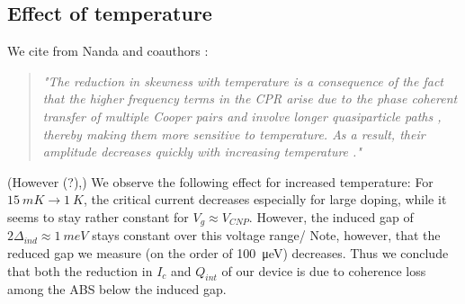 \subsection{Effect of temperature}
We cite from Nanda and coauthors \cite{nanda_currentphase_2017}:
\begin{quotation}
	\textit{"The reduction in skewness with temperature is a consequence of the fact that the higher frequency terms in the CPR arise due to the phase coherent transfer of multiple Cooper pairs and involve longer quasiparticle paths \cite{heikkilaSupercurrentcarryingDensityStates2002}, thereby making them more sensitive to temperature.
	As a result, their amplitude decreases quickly with increasing temperature \cite{hagymasiJosephsonCurrentBallistic2010,black-schafferStronglyAnharmonicCurrentphase2010,rakytaMagneticFieldOscillations2016,english_observation_2016}."}
\end{quotation}

(However (?),) We observe the following effect for increased temperature:
For $\SI{15}{mK}\rightarrow\SI{1}{K}$, the critical current decreases especially for large doping, while it seems to stay rather constant for $V_g\approx V_{CNP}$.
However, the induced gap of $2\Delta_{ind}\approx\SI{1}{meV}$ stays constant over this voltage range/ Note, however, that the reduced gap we measure (on the order of \SI{100}{\micro eV}) decreases.
Thus we conclude that both the reduction in $I_c$ and $Q_{int}$ of our device is due to coherence loss among the ABS below the induced gap.
